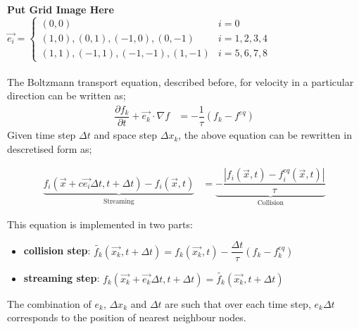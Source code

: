\documentclass[12pt,a4paper]{report}
\begin{document}
	\textbf{Put Grid Image Here}\\
	$
	\vec{e_{i}} = 
	\begin{cases}
		(0,0) & i = 0\\
		(1,0),(0,1),(-1,0),(0,-1) & i = 1,2,3,4\\
		(1,1),(-1,1),(-1,-1),(1,-1) & i = 5,6,7,8
	\end{cases}
	$\\
	\\
	The Boltzmann transport equation, described before, for velocity 
	in a particular direction can be written as;
	\begin{align}
		\dfrac{\partial f_k}{\partial t} +\vec{e_k}\cdot \nabla f &= -\dfrac{1}{\tau}\left(f_k - f^{eq}\right)
	\end{align}
	Given time step $\Delta t$ and space step $\Delta x_k$, the above 
	equation can be rewritten in descretised form as;

	\begin{align}
		\underbrace{f_i\left(\vec{x} + c\vec{e_i}\Delta t, t+\Delta t\right) - f_i\left(\vec{x}, t\right)}_{\text{Streaming}} &= \underbrace{ -\dfrac{|f_i\left(\vec{x},t\right) - f^{eq}_i\left(\vec{x},t\right)|}{\tau}}_{\text{Collision}}
	\end{align}
	
	This equation is implemented in two parts:
	\begin{itemize}
		\item \textbf{collision step}: $\tilde{f_k}\left(\vec{x_k}, t+\Delta t\right) = f_k\left(\vec{x_k}, t\right) - \dfrac{\Delta t}{\tau}\left(f_k - f^{eq}_k\right)$
		\item \textbf{streaming step}: $f_k\left(\vec{x_k} + \vec{e_k}\Delta t, t+\Delta t\right) = \tilde{f_k}\left(\vec{x_k}, t+\Delta t\right)$
	\end{itemize}
	The combination of $e_k$, $\Delta x_k$ and $\Delta t$ are such that over each time step, $e_k\Delta t$ 
	corresponds to the position of nearest neighbour nodes.	
	
	
\end{document}

